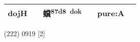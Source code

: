 \documentclass[14pt,a4paper]{scrartcl}
\begin{document}
\begin{longtable}[c]{@{}llllll@{}}
\begin{minipage}[t]{0.14\columnwidth}
dojH
\strut\end{minipage} &
\begin{minipage}[t]{0.14\columnwidth}\raggedright\strut
\strut\end{minipage} &
\begin{minipage}[t]{0.14\columnwidth}\raggedright\strut
蟘\textsuperscript{87d8~dok}
\strut\end{minipage} &
\begin{minipage}[t]{0.14\columnwidth}\raggedright\strut
\strut\end{minipage} &
\begin{minipage}[t]{0.14\columnwidth}\raggedright\strut
pure:A
\strut\end{minipage}\tabularnewline
\bottomrule
\end{longtable}

(222) 0919 {[}2{]}
\end{document}
